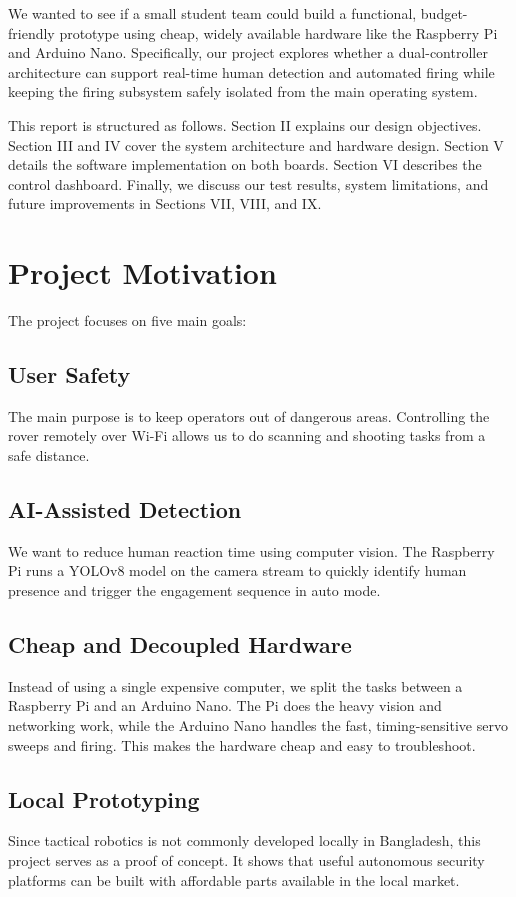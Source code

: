 \documentclass[conference]{IEEEtran}
\begin{document}
We wanted to see if a small student team could build a functional, budget-friendly prototype using cheap, widely available hardware like the Raspberry Pi and Arduino Nano. Specifically, our project explores whether a dual-controller architecture can support real-time human detection and automated firing while keeping the firing subsystem safely isolated from the main operating system.

This report is structured as follows. Section II explains our design objectives. Section III and IV cover the system architecture and hardware design. Section V details the software implementation on both boards. Section VI describes the control dashboard. Finally, we discuss our test results, system limitations, and future improvements in Sections VII, VIII, and IX.

\section{Project Motivation}
The project focuses on five main goals:

\subsection{User Safety}
The main purpose is to keep operators out of dangerous areas. Controlling the rover remotely over Wi-Fi allows us to do scanning and shooting tasks from a safe distance.

\subsection{AI-Assisted Detection}
We want to reduce human reaction time using computer vision. The Raspberry Pi runs a YOLOv8 model on the camera stream to quickly identify human presence and trigger the engagement sequence in auto mode.

\subsection{Cheap and Decoupled Hardware}
Instead of using a single expensive computer, we split the tasks between a Raspberry Pi and an Arduino Nano. The Pi does the heavy vision and networking work, while the Arduino Nano handles the fast, timing-sensitive servo sweeps and firing. This makes the hardware cheap and easy to troubleshoot.

\subsection{Local Prototyping}
Since tactical robotics is not commonly developed locally in Bangladesh, this project serves as a proof of concept. It shows that useful autonomous security platforms can be built with affordable parts available in the local market.
\end{document}
